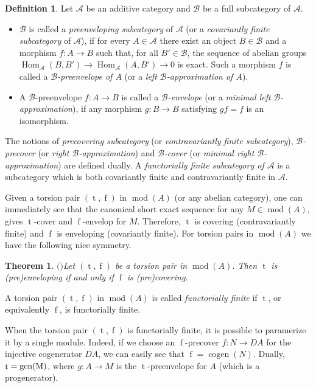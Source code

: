 \documentclass[12pt]{amsart}
\numberwithin{equation}{section}
\newtheorem{theorem}[lemma]{Theorem}
\theoremstyle{definition}
\newtheorem{definition}[lemma]{Definition}
\DeclareMathOperator{\modd}{mod}
\DeclareMathOperator{\Hom}{Hom}
\DeclareMathOperator{\cogen}{cogen}
\DeclareMathOperator{\ts}{t}
\DeclareMathOperator{\fs}{f}
\newtheorem*{theorem 0*}{Theorem}
\newtheorem*{theorem a*}{Theorem A}
\newtheorem*{theorem b*}{Theorem B}
\numberwithin{diagram}{section}
\begin{document}
\begin{definition}
	Let $\mathcal{A}$ be an additive category and $\mathcal{B}$ be a full subcategory of $\mathcal{A}$. 
	\begin{itemize}
	\item[(1)] 	$\mathcal{B}$ is called a {\it preenveloping subcategory} of $\mathcal{A}$ (or a {\it covariantly finite subcategory} of $\mathcal{A}$), if for every $A\in \mathcal{A}$ there exist an object $B\in\mathcal{B}$ and a morphism $f : A\rightarrow B$ such that, for all $B'\in\mathcal{B}$, the sequence of abelian groups $\Hom_\mathcal{A}(B, B')\rightarrow \Hom_\mathcal{A}(A, B')\rightarrow 0$ is exact. Such a morphism $f$ is called a {\it $\mathcal{B}$-preenvelope of $A$} (or a {\it left $\mathcal{B}$-approximation of $A$}).
	\item[(2)] A $\mathcal{B}$-preenvelope $f: A\rightarrow B$ is called a {\it $\mathcal{B}$-envelope} (or a {\it minimal left $\mathcal{B}$-approximation}), if any morphism $g:B\rightarrow B$ satisfying $gf=f$ is an isomorphism.
	\end{itemize}
	The notions of {\it precovering subcategory} (or {\it contravariantly finite subcategory}), {\it $\mathcal{B}$-precover} (or {\it right $\mathcal{B}$-approximation}) and {\it $\mathcal{B}$-cover} (or {\it minimal right $\mathcal{B}$-approximation}) are defined dually. A {\it functorially finite subcategory of $\mathcal{A}$} is a subcategory which is both covariantly finite and contravariantly finite in $\mathcal{A}$.
	\end{definition}
Given a torsion pair $(\ts,\fs)$ in $\modd(A)$ (or any abelian category), one can immediately see that the canonical short exact sequence for any $M\in\modd(A)$, gives $\ts$-cover and $\fs$-envelop for $M$. Therefore, $\ts$ is covering (contravariantly finite) and $\fs$ is enveloping (covariantly finite).
For torsion pairs in $\modd(A)$ we have the following nice symmetry.
	
\begin{theorem}$($\cite{S}$)$\label{2.3}
Let $(\ts,\fs)$ be a torsion pair in $\modd(A)$. Then $\ts$ is (pre)enveloping if and only if $\fs$ is (pre)covering.
\end{theorem}
A torsion pair $(\ts,\fs)$ in $\modd(A)$ is called {\it functorially finite} if $\ts$, or equivalently $\fs$, is functorially finite.

When the torsion pair $(\ts,\fs)$ is functorially finite, it is possible to paramerize it by a single module. Indeed, if we choose an $\fs$-precover $f:N\rightarrow DA$ for the injective cogenerator $DA$, we can easily see that $\fs=\cogen(N)$. Dually, $\ts=\rm gen(M)$, where $g:A\rightarrow M$ is the $\ts$-preenvelope for $A$ (which is a progenerator).
	
\end{document}
